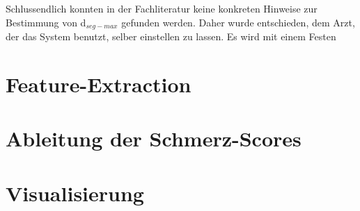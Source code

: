 Schlussendlich konnten in der Fachliteratur keine konkreten Hinweise zur Bestimmung von d$_{seg-max}$ gefunden werden. Daher wurde entschieden, dem Arzt, der das System benutzt, selber einstellen zu lassen. Es wird mit einem Festen 

\section{Feature-Extraction}
\label{sec:segmentFeatures}

\section{Ableitung der Schmerz-Scores}
\label{sec:regressionPainScore}

\section{Visualisierung}
\label{sec:visualisation}